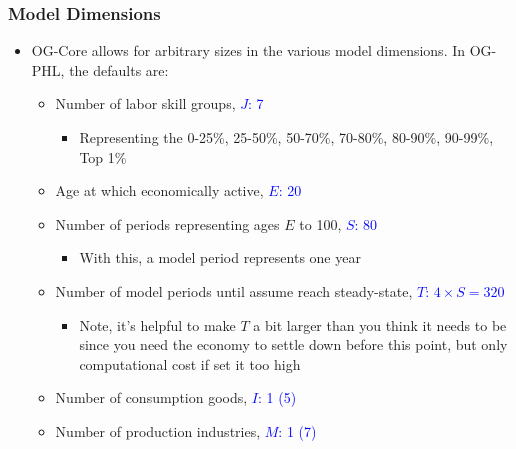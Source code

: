 \documentclass{beamer}
\begin{document}
\begin{frame}
  \frametitle{Model Dimensions}
  \begin{itemize}
    \item OG-Core allows for arbitrary sizes in the various model dimensions.  In OG-PHL, the defaults are:
      \begin{itemize}
          \item Number of labor skill groups, \textcolor{blue}{$J$: 7}
            \begin{itemize}
              \item Representing the 0-25\%, 25-50\%, 50-70\%, 70-80\%, 80-90\%, 90-99\%, Top 1\%
            \end{itemize}
          \item Age at which economically active, \textcolor{blue}{$E$: 20}
          \item Number of periods representing ages $E$ to 100, \textcolor{blue}{$S$: 80}
            \begin{itemize}
              \item With this, a model period represents one year
            \end{itemize}
          \item Number of model periods until assume reach steady-state, \textcolor{blue}{$T$: $4 \times S = 320$}
            \begin{itemize}
              \item Note, it's helpful to make $T$ a bit larger than you think it needs to be since you need the economy to settle down before this point, but only computational cost if set it too high
            \end{itemize}
          \item  Number of consumption goods, \textcolor{blue}{$I$: 1 (5)}
          \item  Number of production industries, \textcolor{blue}{$M$: 1 (7)}
      \end{itemize}
  \end{itemize}
\end{frame}
\end{document}
